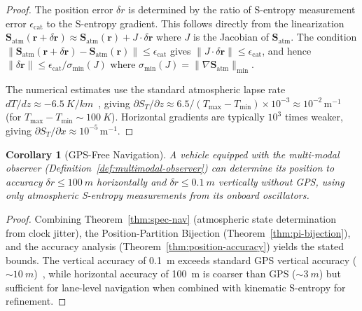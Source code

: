 \documentclass[twocolumn,10pt]{article}
\newtheorem{corollary}[theorem]{Corollary}
\theoremstyle{definition}
\theoremstyle{remark}
\newcommand{\Sent}{\mathbf{S}}
\begin{document}
\begin{proof}
The position error $\delta r$ is determined by the ratio of S-entropy
measurement error $\epsilon_{\mathrm{cat}}$ to the S-entropy gradient.
This follows directly from the linearization
$\Sent_{\mathrm{atm}}(\mathbf{r} + \delta\mathbf{r}) \approx
\Sent_{\mathrm{atm}}(\mathbf{r}) + J \cdot \delta\mathbf{r}$
where $J$ is the Jacobian of $\Sent_{\mathrm{atm}}$. The condition
$\|\Sent_{\mathrm{atm}}(\mathbf{r} + \delta\mathbf{r}) -
\Sent_{\mathrm{atm}}(\mathbf{r})\| \leq \epsilon_{\mathrm{cat}}$
gives $\|J \cdot \delta\mathbf{r}\| \leq \epsilon_{\mathrm{cat}}$,
and hence $\|\delta\mathbf{r}\| \leq \epsilon_{\mathrm{cat}} /
\sigma_{\min}(J)$ where $\sigma_{\min}(J) =
\|\nabla \Sent_{\mathrm{atm}}\|_{\min}$.

The numerical estimates use the standard atmospheric lapse rate
$dT/dz \approx \SI{-6.5}{K/km}$~\cite{kaplan2017}, giving
$\partial S_T / \partial z \approx 6.5/(T_{\max} - T_{\min}) \times
10^{-3} \approx 10^{-2}\,\mathrm{m}^{-1}$ (for $T_{\max} - T_{\min}
\sim \SI{100}{K}$). Horizontal gradients are typically $10^3$ times
weaker, giving $\partial S_T / \partial x \approx 10^{-5}\,\mathrm{m}^{-1}$.
\end{proof}



\begin{corollary}[GPS-Free Navigation]\label{cor:gps-free}
A vehicle equipped with the multi-modal observer
(Definition~\ref{def:multimodal-observer}) can determine its position to
accuracy $\delta r \leq \SI{100}{m}$ horizontally and $\delta r \leq
\SI{0.1}{m}$ vertically without GPS, using only atmospheric S-entropy
measurements from its onboard oscillators.
\end{corollary}

\begin{proof}
Combining Theorem~\ref{thm:spec-nav} (atmospheric state determination from
clock jitter), the Position-Partition Bijection (Theorem~\ref{thm:pi-bijection}),
and the accuracy analysis (Theorem~\ref{thm:position-accuracy}) yields the
stated bounds. The vertical accuracy of \SI{0.1}{m} exceeds standard GPS
vertical accuracy ($\sim\!\SI{10}{m}$)~\cite{kaplan2017}, while horizontal
accuracy of \SI{100}{m} is coarser than GPS ($\sim\!\SI{3}{m}$) but
sufficient for lane-level navigation when combined with kinematic
S-entropy for refinement.
\end{proof}
\end{document}
